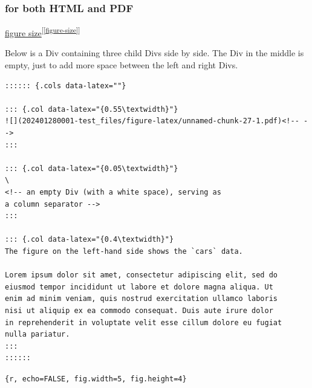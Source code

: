 \documentclass[
]{book}
\theoremstyle{definition}
\theoremstyle{definition}
\theoremstyle{definition}
\theoremstyle{definition}
\theoremstyle{remark}
\begin{document}
\hypertarget{for-both-html-and-pdf}{%
\subsubsection{for both HTML and PDF}\label{for-both-html-and-pdf}}

\protect\hyperlink{figure-size}{figure size}\textsuperscript{{[}\ref{figure-size}{]}}

Below is a Div containing three child Divs side by side. The Div
in the middle is empty, just to add more space between the left
and right Divs.

\begin{verbatim}
:::::: {.cols data-latex=""}

::: {.col data-latex="{0.55\textwidth}"}
![](202401280001-test_files/figure-latex/unnamed-chunk-27-1.pdf)<!-- --> 
:::

::: {.col data-latex="{0.05\textwidth}"}
\ 
<!-- an empty Div (with a white space), serving as
a column separator -->
:::

::: {.col data-latex="{0.4\textwidth}"}
The figure on the left-hand side shows the `cars` data.

Lorem ipsum dolor sit amet, consectetur adipiscing elit, sed do
eiusmod tempor incididunt ut labore et dolore magna aliqua. Ut
enim ad minim veniam, quis nostrud exercitation ullamco laboris
nisi ut aliquip ex ea commodo consequat. Duis aute irure dolor
in reprehenderit in voluptate velit esse cillum dolore eu fugiat
nulla pariatur.
:::
::::::
\end{verbatim}

\texttt{\{r,\ echo=FALSE,\ fig.width=5,\ fig.height=4\}}
\end{document}
